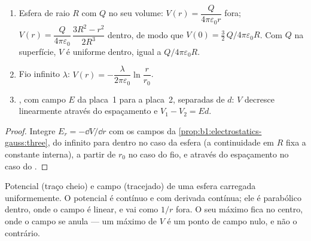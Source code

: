 \begin{proposition}\label{prop:b1:potential-capacitors:classic}
\begin{enumerate}
  \item Esfera de raio $R$ com $Q$ no seu volume: $V(r) = \dfrac{Q}{4\pi\varepsilon_0r}$
        fora; $V(r) = \dfrac{Q}{4\pi\varepsilon_0}\,\dfrac{3R^2 - r^2}{2R^3}$
        dentro, de modo que $V(0) = \tfrac32\,Q/4\pi\varepsilon_0R$. Com $Q$ na superfície,
        $V$ é uniforme dentro, igual a $Q/4\pi\varepsilon_0R$.
  \item Fio infinito $\lambda$: $V(r) = -\dfrac{\lambda}{2\pi\varepsilon_0}\ln\dfrac{r}{r_0}$.
  \item {}, com campo $E$ da placa~1 para a placa~2, separadas de $d$:
        $V$ decresce linearmente através do espaçamento e $V_1 - V_2 = Ed$.
\end{enumerate}
\end{proposition}

\begin{proof}
Integre $E_r = -\dd V/\dd r$ com os campos da
\cref{prop:b1:electrostatics-gauss:three}, do infinito para dentro no caso da
esfera (a continuidade em $R$ fixa a constante interna), a partir de $r_0$ no caso do
fio, e através do espaçamento no caso do .
\end{proof}

\begin{omfigure}

{\small Potencial (traço cheio) e campo (tracejado) de uma esfera carregada
uniformemente. O potencial é contínuo e com derivada contínua; ele é
parabólico dentro, onde o campo é linear, e vai como $1/r$ fora. O seu
máximo fica no centro, onde o campo se anula --- um máximo de
$V$ é um ponto de campo nulo, e não o contrário.}
\end{omfigure}

